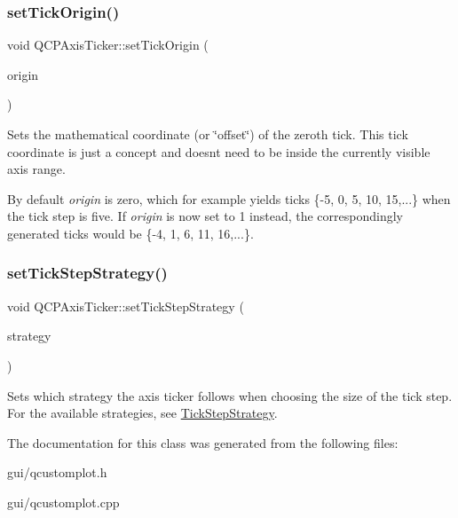 \subsubsection{\texorpdfstring{set\+Tick\+Origin()}{setTickOrigin()}}
{\footnotesize\ttfamily void Q\+C\+P\+Axis\+Ticker\+::set\+Tick\+Origin (\begin{DoxyParamCaption}\item[{double}]{origin }\end{DoxyParamCaption})}

Sets the mathematical coordinate (or \char`\"{}offset\char`\"{}) of the zeroth tick. This tick coordinate is just a concept and doesn\textquotesingle{}t need to be inside the currently visible axis range.

By default {\itshape origin} is zero, which for example yields ticks \{-\/5, 0, 5, 10, 15,...\} when the tick step is five. If {\itshape origin} is now set to 1 instead, the correspondingly generated ticks would be \{-\/4, 1, 6, 11, 16,...\}. \mbox{\label{classQCPAxisTicker_a73b1d847c1a12159af6bfda4ebebe7d5}} 
\subsubsection{\texorpdfstring{set\+Tick\+Step\+Strategy()}{setTickStepStrategy()}}
{\footnotesize\ttfamily void Q\+C\+P\+Axis\+Ticker\+::set\+Tick\+Step\+Strategy (\begin{DoxyParamCaption}\item[{\hyperlink{classQCPAxisTicker_ab6d2f9d9477821623ac9bc4b21ddf49a}{Q\+C\+P\+Axis\+Ticker\+::\+Tick\+Step\+Strategy}}]{strategy }\end{DoxyParamCaption})}

Sets which strategy the axis ticker follows when choosing the size of the tick step. For the available strategies, see \hyperlink{classQCPAxisTicker_ab6d2f9d9477821623ac9bc4b21ddf49a}{Tick\+Step\+Strategy}. 

The documentation for this class was generated from the following files\+:\begin{DoxyCompactItemize}
\item 
gui/qcustomplot.\+h\item 
gui/qcustomplot.\+cpp\end{DoxyCompactItemize}
